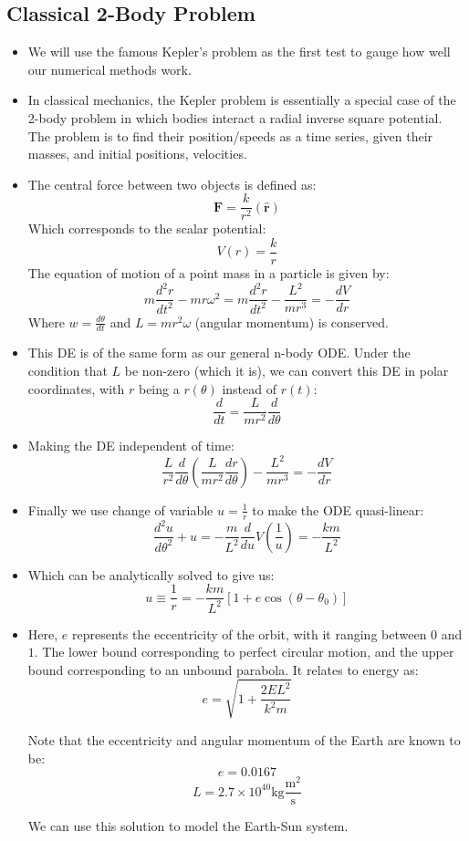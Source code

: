\documentclass[11pt]{article}
\newcommand{\psubsubsection}[1]{{\subsection*{#1}}}
\begin{document}
    \psubsubsection{Classical 2-Body Problem}
    \begin{itemize}
        \item We will use the famous Kepler's problem as the first test to gauge how well our numerical methods work.
        \item In classical mechanics, the Kepler problem is essentially a special case of the 2-body problem in which bodies interact a radial inverse square potential. The problem is to find their position/speeds as a time series, given their masses, and initial positions, velocities.
        \item The central force between two objects is defined as:
        \[ \mathbf{F} = \frac{k}{r^2} (\mathbf{\hat{r}}) \]
        Which corresponds to the scalar potential:
        \[ V(r) = \frac{k}{r} \]
        The equation of motion of a point mass in a particle is given by:
        \[ m\frac{d^2 r}{dt^2} - mr \omega^2 = m\frac{d^2 r}{dt^2} - \frac{L^2}{mr^3} = -\frac{dV}{dr} \]
        Where $w = \frac{d\theta}{dt}$ and $L= mr^2 \omega$ (angular momentum) is conserved.\\
        \item This DE is of the same form as our general n-body ODE. Under the condition that $L$ be non-zero (which it is), we can convert this DE in polar coordinates, with $r$ being a $r(\theta)$ instead of $r(t)$:
        \[ \frac{d}{dt} = \frac{L}{mr^{2}} \frac{d}{d\theta} \]
        \item Making the DE independent of time:
        \[ \frac{L}{r^2} \frac{d}{d\theta} \left( \frac{L}{mr^2} \frac{dr}{d\theta} \right)- \frac{L^2}{mr^3} = -\frac{dV}{dr} \]
        \item Finally we use change of variable $u = \frac{1}{r}$ to make the ODE quasi-linear:
        \[ \frac{d^2 u}{d\theta^2} + u = -\frac{m}{L^2}  \frac{d}{du} V\left( \frac 1 u\right) = -\frac{km}{L^2} \]
        \item Which can be analytically solved to give us:
        \[ u \equiv \frac{1}{r} = -\frac{km}{L^2} \left[ 1 + e \cos(\theta - \theta_0) \right] \]
        \item Here, $e$ represents the eccentricity of the orbit, with it ranging between $0$ and $1$. The lower bound corresponding to perfect circular motion, and the upper bound corresponding to an unbound parabola. It relates to energy as:
        \[ e = \sqrt{1 + \frac{2EL^2}{k^2 m}} \]

    Note that the eccentricity and angular momentum of the Earth are known to be:
        \[ e = 0.0167 \]
        \[ L =  2.7\times10^{40} \text{kg} \frac{\text{m}^2}{\text{s}} \]

    We can use this solution to model the Earth-Sun system.
    \end{itemize}
\end{document}
